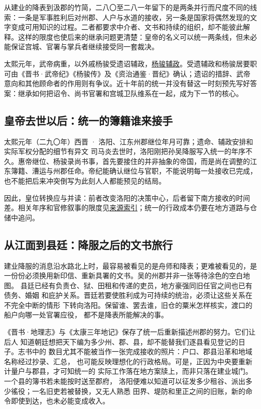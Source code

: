 从建业的降表到汲郡的竹简，二八〇至二八一年留下的是两条并行而尺度不同的线索：一条是军事胜利后对州郡、人户与水道的接收，另一条是国家将偶然发现的文字变成可用知识的过程。二者都要求中介者、文书和持续的组织，却不能彼此解释。这样的限度也使后来的继承问题更清楚：皇帝的名义可以统一两条线，但未必能保证宫城、官署与掌兵者继续接受同一套裁决。

太熙元年，武帝病重，以外戚杨骏受遗诏辅政，\hyperlink{evt:JH-0289-YANG-JUN-REGENT}{\textcolor{dynasty}{杨骏辅政}}。受遗辅政和杨骏居要职可由《晋书·武帝纪》《杨骏传》及《资治通鉴·晋纪》确认；遗诏的措辞、武帝意向和其他顾命者的作用则有争议。近十年前的统一并没有替这一时刻预先写好答案：继承如何把诏令、尚书官署和宫城卫队维系在一起，成为下一节的核心。

\subsection{皇帝去世以后：统一的簿籍谁来接手}
\begin{event}{}{太熙元年（二九〇年）}{西晋 · 洛阳、江东州郡}{继位年月可靠；遗命、辅政安排和实际军权分配的细节有异文}
司马炎去世时，洛阳刚把孙吴降服写入统一的年序不久。惠帝继位、杨骏录尚书事，首先要接住的并非抽象的帝国，而是尚在调整的江东簿籍、漕运与州郡任命。帝纪能确认继位与官职，不能说明每一处接收已完成，也不能把后来冲突倒写为此刻人人都能预见的结局。

因此，皇位转换应与并读：前者改变洛阳的决策中心，后者留下南方接收的时间差。相关年序和官修叙事的限度见\hyperref[app:sources]{来源索引}；统一的行政成本仍要在地方道路与仓储中追问。
\end{event}

\subsection{从江面到县廷：降服之后的文书旅行}

建业降服的消息沿水路北上时，最容易被看见的是舟师和降表；更难被看见的，是
一份份必须换用新印信、重新具署的文书。吴的州郡并非一张等待涂色的空白地图。
县廷已经有负责仓、狱、田租和传递的吏员，地方豪强同旧任官之间也已有债务、婚姻
和庇护关系。晋廷若要使胜利成为可持续的统治，必须让这些关系在不完全中断的情形
下转向洛阳。保留谁、罢去谁，旧仓的粟米怎样核实，渡口的船户向哪一处官署应役，
都不是降表所能解决的事。

《晋书·地理志》与《太康三年地记》保存了统一后重新描述州郡的努力。它们让后人
知道朝廷想把天下编为多少州、郡、县，却不能替我们逐县看见登记的日子。志书中的
数目尤其不能被当作一张完成接收的照片：户口、郡县沿革和地域名称经过抄录、汇总，
也可能反映理想化的行政格局。可是，正因为中央要重新计量户与郡县，才可知统一的
实际工作落在地方案牍上，而非只落在建业城门。一个县的簿书若未能按时送至郡府，
洛阳便难以知道可以征发多少租谷、派出多少徭役；一名旧吏若被替换，又无人熟悉
田界、堤防和里正之间的旧账，新的命令即使到达，也未必能变成收入。

